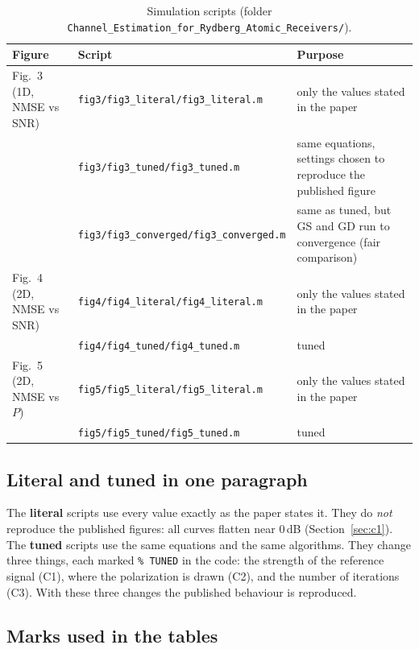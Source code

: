 \documentclass[11pt,a4paper]{article}
\newcommand{\file}[1]{\texttt{#1}}
\begin{document}
\begin{table}[h]
\centering
\small
\caption{Simulation scripts (folder \file{Channel\_Estimation\_for\_Rydberg\_Atomic\_Receivers/}).}
\label{tab:files}
\begin{tabularx}{\textwidth}{L{3.6cm} L{5.2cm} Y}
\toprule
Figure & Script & Purpose \\
\midrule
Fig.~3 (1D, NMSE vs SNR) & \file{fig3/fig3\_literal/fig3\_literal.m} & only the values stated in the paper \\
                         & \file{fig3/fig3\_tuned/fig3\_tuned.m} & same equations, settings chosen to reproduce the published figure \\
                         & \file{fig3/fig3\_converged/fig3\_converged.m} & same as tuned, but GS and GD run to convergence (fair comparison) \\
Fig.~4 (2D, NMSE vs SNR) & \file{fig4/fig4\_literal/fig4\_literal.m} & only the values stated in the paper \\
                         & \file{fig4/fig4\_tuned/fig4\_tuned.m} & tuned \\
Fig.~5 (2D, NMSE vs $P$) & \file{fig5/fig5\_literal/fig5\_literal.m} & only the values stated in the paper \\
                         & \file{fig5/fig5\_tuned/fig5\_tuned.m} & tuned \\
\bottomrule
\end{tabularx}
\end{table}

\subsection{Literal and tuned in one paragraph}

The \textbf{literal} scripts use every value exactly as the paper states it. They do
\emph{not} reproduce the published figures: all curves flatten near 0\,dB (Section~\ref{sec:c1}).
The \textbf{tuned} scripts use the same equations and the same algorithms. They change three
things, each marked \file{\% TUNED} in the code: the strength of the reference signal (C1), where
the polarization is drawn (C2), and the number of iterations (C3). With these three changes the
published behaviour is reproduced.

\subsection{Marks used in the tables}
\end{document}

